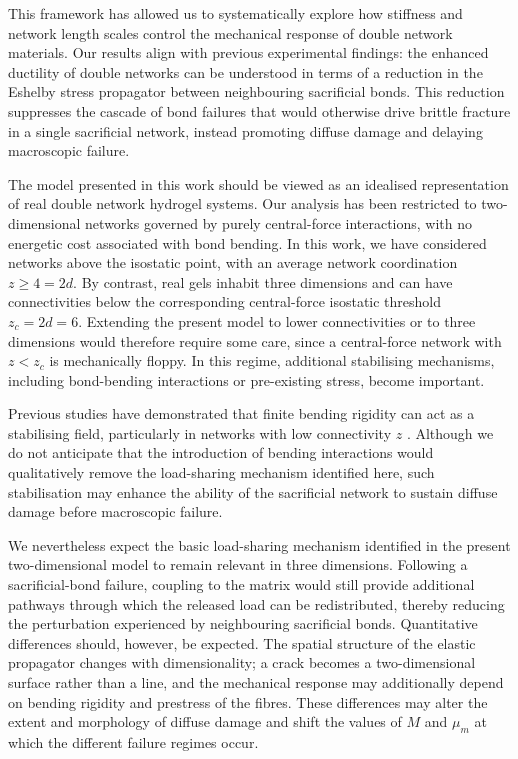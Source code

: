 This framework has allowed us to systematically explore how stiffness and network length scales control the mechanical response of double network materials. Our results align with previous experimental findings: the enhanced ductility of double networks can be understood in terms of a reduction in the Eshelby stress propagator between neighbouring sacrificial bonds. This reduction suppresses the cascade of bond failures that would otherwise drive brittle fracture in a single sacrificial network, instead promoting diffuse damage and delaying macroscopic failure.

The model presented in this work should be viewed as an idealised representation of real double network hydrogel systems. Our analysis has been restricted to two-dimensional networks governed by purely central-force interactions, with no energetic cost associated with bond bending. In this work, we have considered networks above the isostatic point, with an average network coordination $z \geq 4=2d$. By contrast, real gels inhabit three dimensions and can have connectivities below the corresponding central-force isostatic threshold $z_c=2d=6$. Extending the present model to lower connectivities or to three dimensions would therefore require some care, since a central-force network with $z<z_c$ is mechanically floppy. In this regime, additional stabilising mechanisms, including bond-bending interactions or pre-existing stress, become important.

Previous studies have demonstrated that finite bending rigidity can act as a stabilising field, particularly in networks with low connectivity $z$ \cite{shivers_strain-controlled_2023}. Although we do not anticipate that the introduction of bending interactions would qualitatively remove the load-sharing mechanism identified here, such stabilisation may enhance the ability of the sacrificial network to sustain diffuse damage before macroscopic failure.

We nevertheless expect the basic load-sharing mechanism identified in the present two-dimensional model to remain relevant in three dimensions. Following a sacrificial-bond failure, coupling to the matrix would still provide additional pathways through which the released load can be redistributed, thereby reducing the perturbation experienced by neighbouring sacrificial bonds. Quantitative differences should, however, be expected. The spatial structure of the elastic propagator changes with dimensionality; a crack becomes a two-dimensional surface rather than a line, and the mechanical response may additionally depend on bending rigidity and prestress of the fibres. These differences may alter the extent and morphology of diffuse damage and shift the values of $M$ and $\mu_m$ at which the different failure regimes occur.

